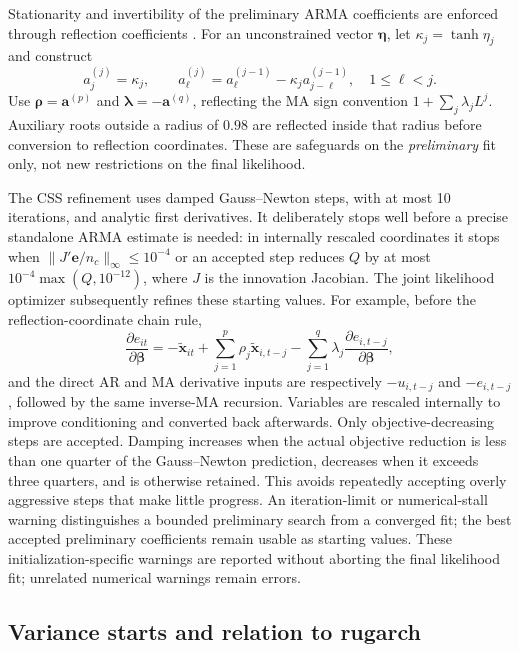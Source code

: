 \documentclass[12pt]{article}
\begin{document}
Stationarity and invertibility of the preliminary ARMA coefficients are
enforced through reflection coefficients \cite{monahan1984note}.
For an unconstrained vector $\boldsymbol\eta$, let $\kappa_j=\tanh\eta_j$ and
construct
\[
 a_j^{(j)}=\kappa_j,\qquad
 a_\ell^{(j)}=a_\ell^{(j-1)}
             -\kappa_j a_{j-\ell}^{(j-1)},\quad 1\leq\ell<j.
\]
Use $\boldsymbol\rho=\mathbf a^{(p)}$ and
$\boldsymbol\lambda=-\mathbf a^{(q)}$, reflecting the MA sign convention
$1+\sum_j\lambda_j L^j$. Auxiliary roots outside a radius of $0.98$ are
reflected inside that radius before conversion to reflection coordinates.
These are safeguards on the \emph{preliminary} fit only, not new restrictions
on the final likelihood.

The CSS refinement uses damped Gauss--Newton steps, with at most 10 iterations,
and analytic first derivatives. It deliberately stops well before a precise
standalone ARMA estimate is needed: in internally rescaled coordinates it
stops when $\|J'\mathbf e/n_c\|_\infty\leq 10^{-4}$ or an accepted step reduces
$Q$ by at most $10^{-4}\max(Q,10^{-12})$, where $J$ is the innovation Jacobian.
The joint likelihood optimizer subsequently refines these starting values.
For example, before the reflection-coordinate
chain rule,
\[
 \frac{\partial e_{it}}{\partial\boldsymbol\beta}
 =-\widetilde{\mathbf x}_{it}
   +\sum_{j=1}^p\rho_j\widetilde{\mathbf x}_{i,t-j}
   -\sum_{j=1}^q\lambda_j
       \frac{\partial e_{i,t-j}}{\partial\boldsymbol\beta},
\]
and the direct AR and MA derivative inputs are respectively $-u_{i,t-j}$
and $-e_{i,t-j}$, followed by the same inverse-MA recursion.
Variables are rescaled internally to improve conditioning and converted back
afterwards. Only objective-decreasing steps are accepted. Damping increases
when the actual objective reduction is less than one quarter of the
Gauss--Newton prediction, decreases when it exceeds three quarters, and is
otherwise retained. This avoids repeatedly accepting overly aggressive steps
that make little progress. An iteration-limit
or numerical-stall warning distinguishes a bounded preliminary search from
a converged fit; the best accepted preliminary coefficients remain usable as
starting values. These initialization-specific warnings are reported without
aborting the final likelihood fit; unrelated numerical warnings remain errors.

\subsection{Variance starts and relation to rugarch}
\end{document}

